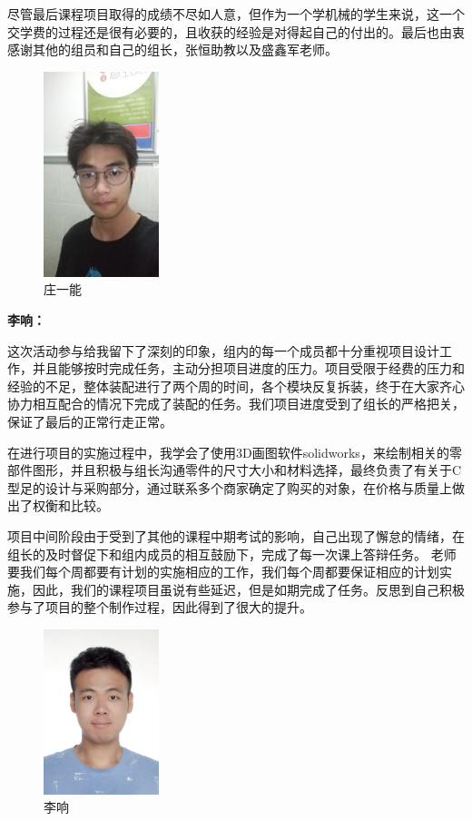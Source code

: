 \documentclass[12pt]{article}
\begin{document}
\begin{CJK}{UTF8}{song}
尽管最后课程项目取得的成绩不尽如人意，但作为一个学机械的学生来说，这一个交学费的过程还是很有必要的，且收获的经验是对得起自己的付出的。最后也由衷感谢其他的组员和自己的组长，张恒助教以及盛鑫军老师。
\begin{figure}[H]
\centering
\includegraphics[width=0.3\textwidth]{photo//zyn.jpg}
\caption{庄一能}
\end{figure}
\textbf{李响：}\par
这次活动参与给我留下了深刻的印象，组内的每一个成员都十分重视项目设计工作，并且能够按时完成任务，主动分担项目进度的压力。项目受限于经费的压力和经验的不足，整体装配进行了两个周的时间，各个模块反复拆装，终于在大家齐心协力相互配合的情况下完成了装配的任务。我们项目进度受到了组长的严格把关，保证了最后的正常行走正常。\par
在进行项目的实施过程中，我学会了使用3D画图软件solidworks，来绘制相关的零部件图形，并且积极与组长沟通零件的尺寸大小和材料选择，最终负责了有关于C型足的设计与采购部分，通过联系多个商家确定了购买的对象，在价格与质量上做出了权衡和比较。\par
项目中间阶段由于受到了其他的课程中期考试的影响，自己出现了懈怠的情绪，在组长的及时督促下和组内成员的相互鼓励下，完成了每一次课上答辩任务。
老师要我们每个周都要有计划的实施相应的工作，我们每个周都要保证相应的计划实施，因此，我们的课程项目虽说有些延迟，但是如期完成了任务。反思到自己积极参与了项目的整个制作过程，因此得到了很大的提升。

\begin{figure}[H]
\centering
\includegraphics[width=0.3\textwidth]{photo//lx.jpg}
\caption{李响}
\end{figure}
\newpage

\end{CJK}
\end{document}
